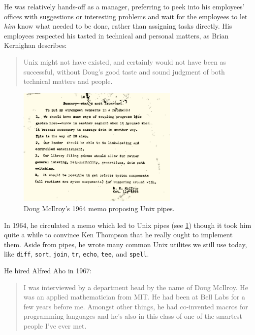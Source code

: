 He was relatively hands-off as a manager, preferring to peek into his employees' offices
with suggestions or interesting problems and wait for the employees to let \textit{him} know
what needed to be done, rather than assigning tasks directly.
His employees respected his tasted in technical and personal matters,
as Brian Kernighan describes\cite{kernighan_unix:_2020}:

\begin{quotation}
	Unix might not have existed, and certainly
	would not have been as successful, without Doug's good taste and sound
	judgment of both technical matters and people.
\end{quotation}

\begin{figure}
	\centering
	\includegraphics[width=0.7\textwidth]{resource/software/unix/doug-1964-pipes.png}
	\caption{Doug McIlroy's 1964 memo proposing Unix pipes\cite{doug_mcilroy_origin_of_unix_pipes_1964}.}
	\label{fig:unix-pipes-mcilroy-memo}
\end{figure}

In 1964, he circulated a memo which led to Unix pipes\cite{doug_mcilroy_origin_of_unix_pipes_1964}
(see \ref{fig:unix-pipes-mcilroy-memo}) though it took him quite a while to convince
Ken Thompson that he really ought to implement them.
Aside from pipes, he wrote many common Unix utilites we still use today, like
\texttt{diff}, \texttt{sort}, \texttt{join}, \texttt{tr}, \texttt{echo}, \texttt{tee}, and \texttt{spell}.

He hired Alfred Aho in 1967\cite{aho_oral_history_2022}:

\begin{quotation}
	I was interviewed by a department head by the name of Doug McIlroy. He was an applied
	mathematician from MIT. He had been at Bell Labs for a few years before me. Amongst other things, he
	had co-invented macros for programming languages and he's also in this class of one of the smartest
	people I've ever met.
\end{quotation}

